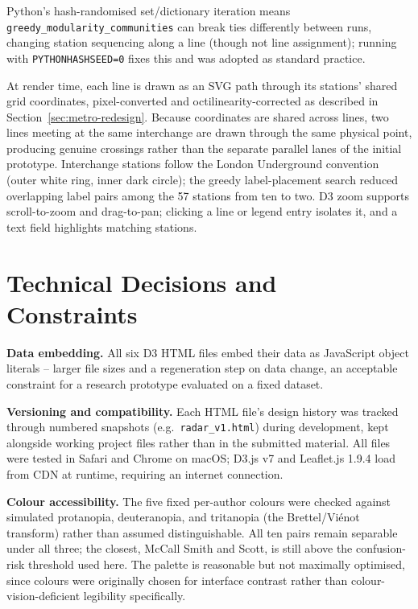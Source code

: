 \documentclass[logo,msc]{infthesis}
\begin{document}
Python's hash-randomised set/dictionary iteration means \texttt{greedy\_modularity\_communities} can break ties differently between runs, changing station sequencing along a line (though not line assignment); running with \texttt{PYTHONHASHSEED=0} fixes this and was adopted as standard practice.

At render time, each line is drawn as an SVG path through its stations' shared grid coordinates, pixel-converted and octilinearity-corrected as described in Section~\ref{sec:metro-redesign}. Because coordinates are shared across lines, two lines meeting at the same interchange are drawn through the same physical point, producing genuine crossings rather than the separate parallel lanes of the initial prototype. Interchange stations follow the London Underground convention (outer white ring, inner dark circle); the greedy label-placement search reduced overlapping label pairs among the 57 stations from ten to two. D3 zoom supports scroll-to-zoom and drag-to-pan; clicking a line or legend entry isolates it, and a text field highlights matching stations.
 
\section{Technical Decisions and Constraints}
\label{sec:technical-decisions}

\textbf{Data embedding.} All six D3 HTML files embed their data as JavaScript object literals -- larger file sizes and a regeneration step on data change, an acceptable constraint for a research prototype evaluated on a fixed dataset.
 
\textbf{Versioning and compatibility.} Each HTML file's design history was tracked through numbered snapshots (e.g.\ \texttt{radar\_v1.html}) during development, kept alongside working project files rather than in the submitted material. All files were tested in Safari and Chrome on macOS; D3.js v7 and Leaflet.js 1.9.4 load from CDN at runtime, requiring an internet connection.

\textbf{Colour accessibility.} The five fixed per-author colours were checked against simulated protanopia, deuteranopia, and tritanopia (the Brettel/Vi{\'e}not transform) rather than assumed distinguishable. All ten pairs remain separable under all three; the closest, McCall Smith and Scott, is still above the confusion-risk threshold used here. The palette is reasonable but not maximally optimised, since colours were originally chosen for interface contrast rather than colour-vision-deficient legibility specifically.
 
\end{document}
